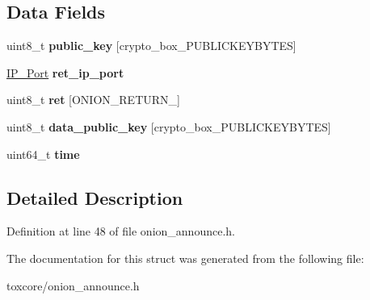 \subsection*{Data Fields}
\begin{DoxyCompactItemize}
\item 
\hypertarget{struct_onion___announce___entry_aaa806bb1136fb3d4b5d8d8970b596ff7}{uint8\+\_\+t {\bfseries public\+\_\+key} \mbox{[}crypto\+\_\+box\+\_\+\+P\+U\+B\+L\+I\+C\+K\+E\+Y\+B\+Y\+T\+E\+S\mbox{]}}\label{struct_onion___announce___entry_aaa806bb1136fb3d4b5d8d8970b596ff7}

\item 
\hypertarget{struct_onion___announce___entry_a28f2dcc657352ee4855d05ed42e4a4af}{\hyperlink{struct_i_p___port}{I\+P\+\_\+\+Port} {\bfseries ret\+\_\+ip\+\_\+port}}\label{struct_onion___announce___entry_a28f2dcc657352ee4855d05ed42e4a4af}

\item 
\hypertarget{struct_onion___announce___entry_a860a2c4025701999e0d03f73b1863cdd}{uint8\+\_\+t {\bfseries ret} \mbox{[}O\+N\+I\+O\+N\+\_\+\+R\+E\+T\+U\+R\+N\+\_\mbox{]}}\label{struct_onion___announce___entry_a860a2c4025701999e0d03f73b1863cdd}

\item 
\hypertarget{struct_onion___announce___entry_add8f6d39a7818b6d3ff0fca42a0aadf4}{uint8\+\_\+t {\bfseries data\+\_\+public\+\_\+key} \mbox{[}crypto\+\_\+box\+\_\+\+P\+U\+B\+L\+I\+C\+K\+E\+Y\+B\+Y\+T\+E\+S\mbox{]}}\label{struct_onion___announce___entry_add8f6d39a7818b6d3ff0fca42a0aadf4}

\item 
\hypertarget{struct_onion___announce___entry_a5d34a8f2dfe25421b2b473a5fd37b0ed}{uint64\+\_\+t {\bfseries time}}\label{struct_onion___announce___entry_a5d34a8f2dfe25421b2b473a5fd37b0ed}

\end{DoxyCompactItemize}


\subsection{Detailed Description}


Definition at line 48 of file onion\+\_\+announce.\+h.



The documentation for this struct was generated from the following file\+:\begin{DoxyCompactItemize}
\item 
toxcore/onion\+\_\+announce.\+h\end{DoxyCompactItemize}
